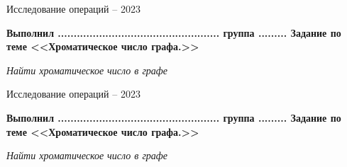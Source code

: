 \documentclass[a4paper,12pt]{article}
\begin{document}
        
             \begin{center} 
             Исследование операций --  2023 
            \end{center}
            \newline 
            \begin{center}
            \textbf{Выполнил ................................................... группа .........   Задание по теме <<Хроматическое число графа.>> }
            \end{center}
            \begin{flushleft} 
            \begin{center}     
            \textit{Найти хроматическое число в графе} 
            \end{center}
            \end{flushleft}

             \begin{center} 
             Исследование операций --  2023 
            \end{center}
            \newline 
            \begin{center}
            \textbf{Выполнил ................................................... группа .........   Задание по теме <<Хроматическое число графа.>> }
            \end{center}
            \begin{flushleft} 
            \begin{center}     
            \textit{Найти хроматическое число в графе} 
            \end{center}
            \end{flushleft}
\end{document}
